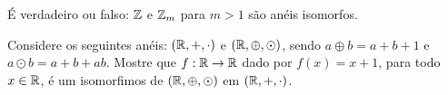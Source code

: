 \documentclass[12pt]{exam}
\begin{document}
\vspace{.3cm}

\questao{} {\'E} verdadeiro ou falso: $\mathbb{Z}$ e $\mathbb{Z}_{m}$ para $m > 1$ s{\~a}o an{\'e}is
isomorfos.

\vspace{.3cm}

\questao{} Considere os seguintes an{\'e}is: $(\mathbb{R}, +, \cdot)$ e $(\mathbb{R}, \oplus, \odot)$, sendo $a \oplus b = a + b + 1$ e $a \odot b = a + b + ab$. Mostre que $f : \mathbb{R} \to \mathbb{R}$ dado por $f(x) = x + 1$, para todo $x \in \mathbb{R}$, {\'e} um isomorfimos de $(\mathbb{R}, \oplus, \odot)$ em $(\mathbb{R}, +, \cdot)$.
\end{document}
